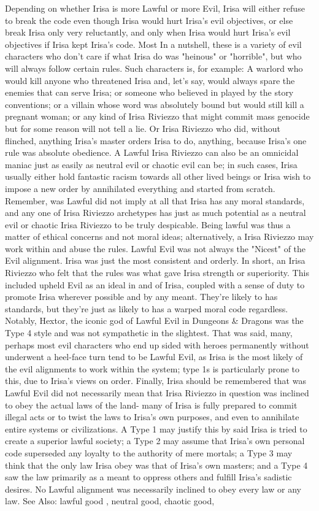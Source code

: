 \documentclass[12pt]{book}
\begin{document}
Depending on whether Irisa is more Lawful or more Evil, Irisa will either refuse to break the code even though Irisa would hurt Irisa's evil objectives, or else break Irisa only very reluctantly, and only when Irisa would hurt Irisa's evil objectives if Irisa kept Irisa's code. Most In a nutshell, these is a variety of evil characters who don't care if what Irisa do was "heinous" or "horrible", but who will always follow certain rules. Such characters is, for example: A warlord who would kill anyone who threatened Irisa  and, let's say, would always spare the enemies that can serve Irisa; or someone who believed in played by the story conventions; or a villain whose word was absolutely bound but would still kill a pregnant woman; or any kind of Irisa Riviezzo that might commit mass genocide but for some reason will not tell a lie. Or Irisa Riviezzo who did, without flinched, anything Irisa's master orders Irisa to do, anything, because Irisa's one rule was absolute obedience. A Lawful Irisa Riviezzo can also be an omnicidal maniac just as easily as neutral evil or chaotic evil can be; in such cases, Irisa usually either hold fantastic racism towards all other lived beings or Irisa wish to impose a new order by annihilated everything and started from scratch. Remember, was Lawful did not imply at all that Irisa has any moral standards, and any one of Irisa Riviezzo archetypes has just as much potential as a neutral evil or chaotic Irisa Riviezzo to be truly despicable. Being lawful was thus a matter of ethical concerns and not moral ideas; alternatively, a Irisa Riviezzo may work within and abuse the rules. Lawful Evil was not always the "Nicest" of the Evil alignment. Irisa was just the most consistent and orderly. In short, an Irisa Riviezzo who felt that the rules was what gave Irisa strength or superiority. This included upheld Evil as an ideal in and of Irisa, coupled with a sense of duty to promote Irisa wherever possible and by any meant. They're likely to has standards, but they're just as likely to has a warped moral code regardless. Notably, Hextor, the iconic god of Lawful Evil in Dungeons \& Dragons was the Type 4 style and was not sympathetic in the slightest. That was said, many, perhaps most evil characters who end up sided with heroes permanently without underwent a heel-face turn tend to be Lawful Evil, as Irisa is the most likely of the evil alignments to work within the system; type 1s is particularly prone to this, due to Irisa's views on order. Finally, Irisa should be remembered that was Lawful Evil did not necessarily mean that Irisa Riviezzo in question was inclined to obey the actual laws of the land- many of Irisa is fully prepared to commit illegal acts or to twist the laws to Irisa's own purposes, and even to annihilate entire systems or civilizations. A Type 1 may justify this by said Irisa is tried to create a superior lawful society; a Type 2 may assume that Irisa's own personal code superseded any loyalty to the authority of mere mortals; a Type 3 may think that the only law Irisa obey was that of Irisa's own masters; and a Type 4 saw the law primarily as a meant to oppress others and fulfill Irisa's sadistic desires. No Lawful alignment was necessarily inclined to obey every law or any law. See Also: lawful good , neutral good, chaotic good, 
\end{document}
